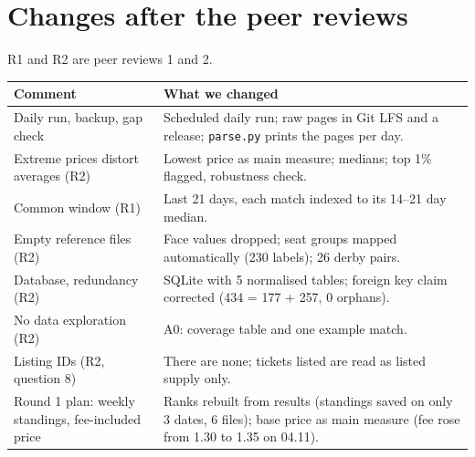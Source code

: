 \documentclass[11pt,a4paper]{article}
\begin{document}
\section{Changes after the peer reviews}

R1 and R2 are peer reviews 1 and 2.

\noindent
\begin{tabular}{p{}p{}}
\toprule
Comment & What we changed \\
\midrule
Daily run, backup, gap check & Scheduled daily run; raw pages in Git LFS and a release; \texttt{parse.py} prints the pages per day. \\
Extreme prices distort averages (R2) & Lowest price as main measure; medians; top 1\% flagged, robustness check. \\
Common window (R1) & Last 21 days, each match indexed to its 14--21 day median. \\
Empty reference files (R2) & Face values dropped; seat groups mapped automatically (230 labels); 26 derby pairs. \\
Database, redundancy (R2) & SQLite with 5 normalised tables; foreign key claim corrected (434 = 177 + 257, 0 orphans). \\
No data exploration (R2) & A0: coverage table and one example match. \\
Listing IDs (R2, question 8) & There are none; tickets listed are read as listed supply only. \\
Round 1 plan: weekly standings, fee-included price & Ranks rebuilt from results (standings saved on only 3 dates, 6 files); base price as main measure (fee rose from 1.30 to 1.35 on 04.11). \\
\bottomrule
\end{tabular}
\end{document}
